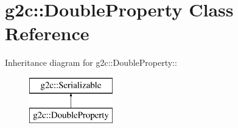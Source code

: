 \hypertarget{classg2c_1_1_double_property}{
\section{g2c::DoubleProperty Class Reference}
\label{classg2c_1_1_double_property}
}
Inheritance diagram for g2c::DoubleProperty::\begin{figure}[H]
\begin{center}
\leavevmode
\includegraphics[height=2cm]{classg2c_1_1_double_property}
\end{center}
\end{figure}
